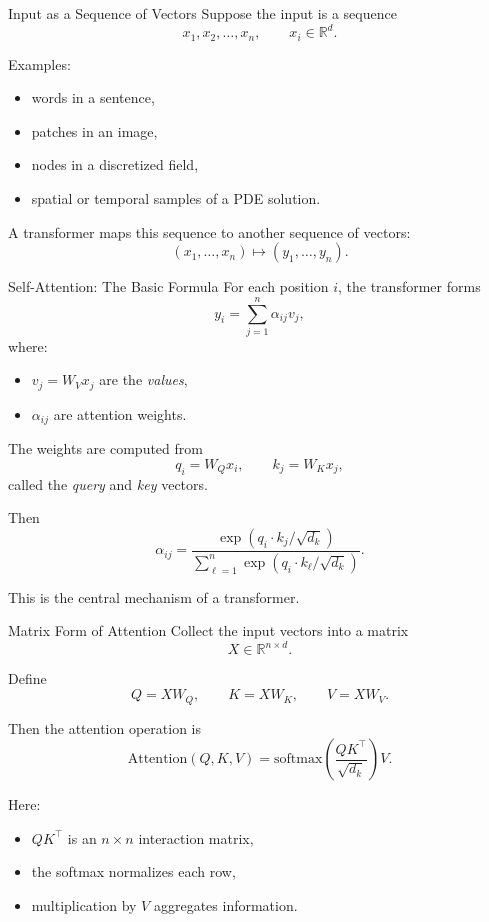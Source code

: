 \documentclass{beamer}
\begin{document}
\begin{frame}{Input as a Sequence of Vectors}
  Suppose the input is a sequence
  \[
  x_1, x_2, \dots, x_n,
  \qquad x_i \in \mathbb{R}^d.
  \]

  Examples:
  \begin{itemize}
  \item words in a sentence,
  \item patches in an image,
  \item nodes in a discretized field,
  \item spatial or temporal samples of a PDE solution.
  \end{itemize}

  A transformer maps this sequence to another sequence of vectors:
  \[
  (x_1,\dots,x_n) \longmapsto (y_1,\dots,y_n).
  \]
\end{frame}

\begin{frame}{Self-Attention: The Basic Formula}
  For each position \(i\), the transformer forms
  \[
  y_i = \sum_{j=1}^n \alpha_{ij} v_j,
  \]
  where:
  \begin{itemize}
  \item \(v_j = W_V x_j\) are the \emph{values},
  \item \(\alpha_{ij}\) are attention weights.
  \end{itemize}

  The weights are computed from
  \[
  q_i = W_Q x_i, \qquad k_j = W_K x_j,
  \]
  called the \emph{query} and \emph{key} vectors.

  Then
  \[
  \alpha_{ij}
  =
  \frac{\exp\!\left(q_i \cdot k_j / \sqrt{d_k}\right)}
       {\sum_{\ell=1}^n \exp\!\left(q_i \cdot k_\ell / \sqrt{d_k}\right)}.
       \]

       This is the central mechanism of a transformer.
\end{frame}

\begin{frame}{Matrix Form of Attention}
  Collect the input vectors into a matrix
  \[
  X \in \mathbb{R}^{n \times d}.
  \]

  Define
  \[
  Q = X W_Q,\qquad K = X W_K,\qquad V = X W_V.
  \]

  Then the attention operation is
  \[
  \mathrm{Attention}(Q,K,V)
  =
  \mathrm{softmax}\!\left(\frac{QK^\top}{\sqrt{d_k}}\right)V.
  \]

  Here:
  \begin{itemize}
  \item \(QK^\top\) is an \(n\times n\) interaction matrix,
  \item the softmax normalizes each row,
  \item multiplication by \(V\) aggregates information.
  \end{itemize}
\end{frame}
\end{document}
